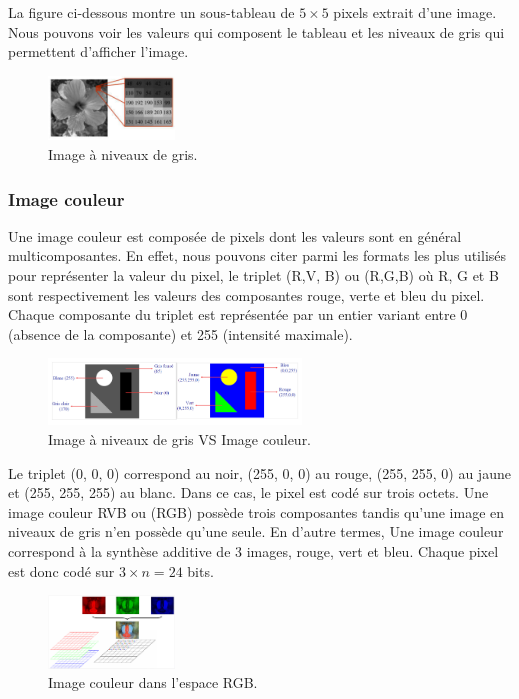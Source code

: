 La figure ci-dessous montre un sous-tableau de $5 \times 5$ pixels extrait d’une image. Nous pouvons voir les valeurs qui composent le tableau et les niveaux de gris qui permettent d’afficher l'image.

\begin{figure}[H]
	\centering
	\includegraphics[width=0.3\textwidth]{Figures/gray} 
	\caption{Image à niveaux de gris.}
\end{figure}

\subsubsection{Image couleur}
Une image couleur est composée de pixels dont les valeurs sont en général multicomposantes. En effet, nous pouvons citer parmi les formats les plus utilisés pour représenter la valeur du pixel, le triplet (R,V, B) ou (R,G,B) où R, G et B sont respectivement les valeurs des composantes rouge, verte et bleu du pixel. Chaque composante du triplet est représentée par un entier variant entre 0
(absence de la composante) et 255 (intensité maximale). 

\begin{figure}[H]
	\centering
	\includegraphics[width=0.6\textwidth]{Figures/grayvscol} 
	\caption{Image à niveaux de gris VS Image couleur.}
\end{figure}

Le triplet (0, 0, 0) correspond au noir, (255, 0, 0) au rouge, (255, 255, 0) au jaune et (255, 255, 255) au blanc.  Dans ce cas, le pixel est codé sur trois octets. Une image couleur RVB ou (RGB) possède trois composantes tandis qu'une image en niveaux de gris n’en possède qu’une seule. En d'autre termes, Une image couleur correspond à la synthèse additive de 3 images, rouge, vert et bleu. Chaque pixel est donc codé sur $3 \times n = 24 $ bits.

\begin{figure}[H]
	\centering
	\includegraphics[width=0.3\textwidth]{Figures/rgb} 
	\caption{Image couleur dans l’espace RGB.}
\end{figure}

